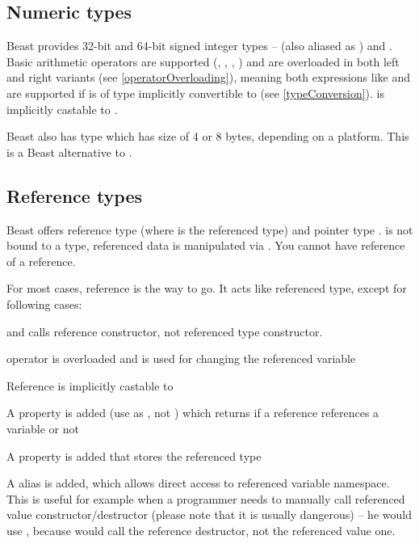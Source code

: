 \subsection{Numeric types}
Beast provides 32-bit and 64-bit signed integer types --  (also aliased as ) and . Basic arithmetic operators are supported (\inlineCode{+}, \inlineCode{-}, \inlineCode{*}, \inlineCode{/}) and are overloaded in both left and right variants (see \autoref{operatorOverloading}), meaning both expressions like  and  are supported if  is of type implicitly convertible to  (see \autoref{typeConversion}).  is implicitly castable to .

Beast also has type  which has size of 4 or 8 bytes, depending on a platform. This is a Beast alternative to .

\subsection{Reference types}
Beast offers reference type  (where  is the referenced type) and pointer type .  is not bound to a type, referenced data is manipulated via .  You cannot have reference of a reference.

For most cases, reference is the way to go. It acts like referenced type, except for following cases:
\begin{compactitem}
	\item {} and  calls reference constructor, not referenced type constructor.
	\item {} operator is overloaded and is used for changing the referenced variable
	\item Reference is implicitly castable to 
	\item A  property is added (use as , not ) which returns if a reference references a variable or not
	\item A  property is added that stores the referenced type
	\item A  alias is added, which allows direct access to referenced variable namespace. This is useful for example when a programmer needs to manually call referenced value constructor/destructor (please note that it is usually dangerous) -- he would use \-, because  would call the reference destructor, not the referenced value one.
\end{compactitem}

